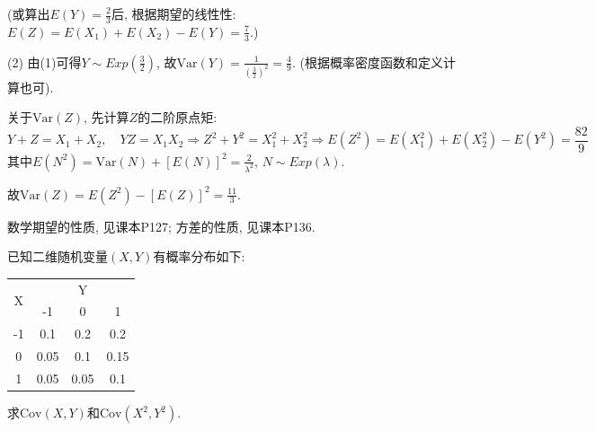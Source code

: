 \documentclass[standard]{ExBook}
\begin{document}
\begin{qitems}
\vspace{-5em}

    \begin{bbox}
(或算出$E(Y)=\displaystyle\frac{2}{3}$后, 根据期望的线性性: $E(Z)=E(X_1)+E(X_2)-E(Y)=\displaystyle\frac{7}{3}$.)

(2) 由(1)可得$Y\sim Exp(\displaystyle\frac{3}{2})$, 故$\displaystyle\mathrm{Var}(Y)=\frac{1}{\left(\frac{3}{2}\right)^2}=\frac{4}{9}$. (根据概率密度函数和定义计算也可).

关于$\mathrm{Var}(Z)$, 先计算$Z$的二阶原点矩:
$$Y+Z=X_1+X_2,\quad YZ=X_1 X_2 \Longrightarrow Z^2+Y^2=X_1^2+X_2^2 \Longrightarrow E(Z^2)=E(X_1^2)+E(X_2^2)-E(Y^2)=\frac{82}{9}$$
其中$E(N^2)=\mathrm{Var}(N)+\left[E(N)\right]^2=\displaystyle\frac{2}{\lambda^2}$, $N\sim Exp(\lambda)$.

故$\mathrm{Var}(Z)=E(Z^2)-\left[E(Z)\right]^2=\displaystyle\frac{11}{3}$.

\textcolor{themeColor}{\selectfont {} 数学期望的性质, 见课本P127; 方差的性质, 见课本P136.}
    \end{bbox}

\vspace{-5em}

    \begin{bbox}
    \begin{shaded}
        \qitem
已知二维随机变量$(X,Y)$有概率分布如下:
\begin{center}
    \setlength{\tabcolsep}{4em}
    \begin{threeparttable}
    \begin{tabular}{c|ccc}
        \hline
        \multirow{2}{*}{X} & \multicolumn{3}{c}{Y}\\
        \cline{2-4}
        & -1 & 0 & 1\\
        \hline
        -1 & 0.1 & 0.2 & 0.2 \\
        \hline
        0 & 0.05 & 0.1 & 0.15\\
        \hline
        1 & 0.05 & 0.05 & 0.1\\
        \hline
    \end{tabular}
    \end{threeparttable}
\end{center}
求$\mathrm{Cov}(X,Y)$和$\mathrm{Cov}(X^2,Y^2)$.
    \end{shaded}
    \end{bbox}

\vspace{-5em}


\end{qitems}
\end{document}
